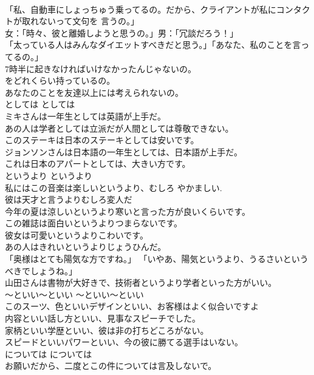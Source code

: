 \documentclass[8pt]{extreport}
\begin{document}
\begin{CJK}{UTF8}{min}
\\	「私、自動車にしょっちゅう乗ってるの。だから、クライアントが私にコンタクトが取れないって文句を 言うの。」  
\\	女：「時々、彼と離婚しようと思うの。」男：「冗談だろう！」   
\\	「太っている人はみんなダイエットすべきだと思う。」「あなた、私のことを言ってるの。」  
\\	7時半に起きなければいけなかったんじゃないの。  
\\	をどれくらい持っているの。  
\\	あなたのことを友達以上には考えられないの。  
\\	としては	としては	
\\	ミキさんは一年生としては英語が上手だ。  
\\	あの人は学者としては立派だが人間としては尊敬できない。  
\\	このステーキは日本のステーキとしては安いです。  
\\	ジョンソンさんは日本語の一年生としては、日本語が上手だ。  
\\	これは日本のアパートとしては、大きい方です。  
\\	というより	というより	
\\	私にはこの音楽は楽しいというより、むしろ やかましい.  
\\	彼は天才と言うよりむしろ変人だ  
\\	今年の夏は涼しいというより寒いと言った方が良いくらいです。  
\\	この雑誌は面白いというよりつまらないです。  
\\	彼女は可愛いというよりこわいです。  
\\	あの人はきれいというよりじょうひんだ。  
\\	「奥様はとても陽気な方ですね。」 「いやあ、陽気というより、うるさいというべきでしょうね。」  
\\	山田さんは書物が大好きで、技術者というより学者といった方がいい。  
\\	〜といい〜といい	〜といい〜といい	
\\	このスーツ、色といいデザインといい、お客様はよく似合いですよ   
\\	内容といい話し方といい、見事なスピーチでした。   
\\	家柄といい学歴といい、彼は非の打ちどころがない。   
\\	スピードといいパワーといい、今の彼に勝てる選手はいない。   
\\	については	については	
\\	お願いだから、二度とこの件については言及しないで。  

\end{CJK}
\end{document}
